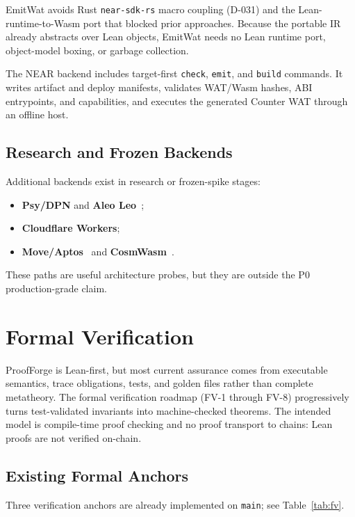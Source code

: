\documentclass[sigconf]{acmart}
\begin{document}
EmitWat avoids Rust \texttt{near-sdk-rs} macro coupling (D-031) and the Lean-runtime-to-Wasm
port that blocked prior approaches. Because the portable IR already abstracts over Lean
objects, EmitWat needs no Lean runtime port, object-model boxing, or garbage collection.

The NEAR backend includes target-first \texttt{check}, \texttt{emit}, and \texttt{build}
commands. It writes artifact and deploy manifests, validates WAT/Wasm hashes,
ABI entrypoints, and capabilities, and executes the generated Counter WAT through
an offline host.

\subsection{Research and Frozen Backends}

Additional backends exist in research or frozen-spike stages:
\begin{itemize}[leftmargin=*,nosep]
  \item \textbf{Psy/DPN} and \textbf{Aleo Leo}~\cite{aleo};
  \item \textbf{Cloudflare Workers};
  \item \textbf{Move/Aptos}~\cite{move} and \textbf{CosmWasm}~\cite{cosmwasm}.
\end{itemize}
These paths are useful architecture probes, but they are outside the P0 production-grade claim.

\section{Formal Verification}
\label{sec:fv}

ProofForge is Lean-first, but most current assurance comes from executable semantics,
trace obligations, tests, and golden files rather than complete metatheory. The formal
verification roadmap (FV-1 through FV-8) progressively turns test-validated invariants into
machine-checked theorems. The intended model is compile-time proof checking and no proof
transport to chains: Lean proofs are not verified on-chain.

\subsection{Existing Formal Anchors}

Three verification anchors are already implemented on \texttt{main}; see Table~\ref{tab:fv}.
\end{document}
